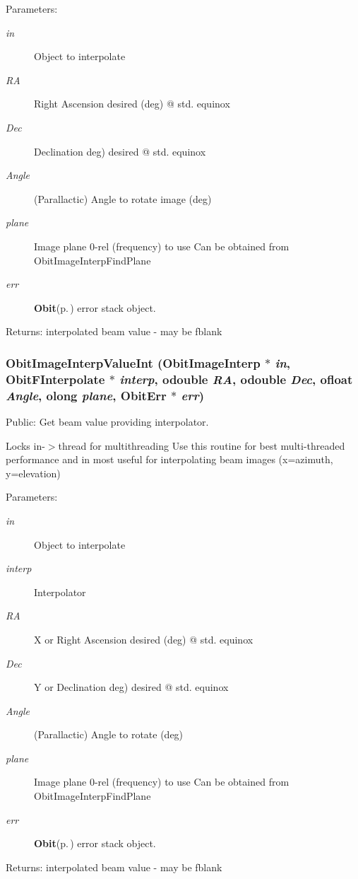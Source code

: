 \begin{Desc}
\item[Parameters:]
\begin{description}
\item[{\em in}]Object to interpolate \item[{\em RA}]Right Ascension desired (deg) @ std. equinox \item[{\em Dec}]Declination deg) desired @ std. equinox \item[{\em Angle}](Parallactic) Angle to rotate image (deg) \item[{\em plane}]Image plane 0-rel (frequency) to use Can be obtained from Obit\-Image\-Interp\-Find\-Plane \item[{\em err}]{\bf Obit}{\rm (p.\,\pageref{structObit})} error stack object. \end{description}
\end{Desc}
\begin{Desc}
\item[Returns:]interpolated beam value - may be fblank \end{Desc}
\subsubsection{ Obit\-Image\-Interp\-Value\-Int ({\bf Obit\-Image\-Interp} $\ast$ {\em in}, {\bf Obit\-FInterpolate} $\ast$ {\em interp}, {\bf odouble} {\em RA}, {\bf odouble} {\em Dec}, {\bf ofloat} {\em Angle}, {\bf olong} {\em plane}, {\bf Obit\-Err} $\ast$ {\em err})}\label{ObitImageInterp_8h_a15}


Public: Get beam value providing interpolator. 

Locks in-$>$thread for multithreading Use this routine for best multi-threaded performance and in most useful for interpolating beam images (x=azimuth, y=elevation) \begin{Desc}
\item[Parameters:]
\begin{description}
\item[{\em in}]Object to interpolate \item[{\em interp}]Interpolator \item[{\em RA}]X or Right Ascension desired (deg) @ std. equinox \item[{\em Dec}]Y or Declination deg) desired @ std. equinox \item[{\em Angle}](Parallactic) Angle to rotate (deg) \item[{\em plane}]Image plane 0-rel (frequency) to use Can be obtained from Obit\-Image\-Interp\-Find\-Plane \item[{\em err}]{\bf Obit}{\rm (p.\,\pageref{structObit})} error stack object. \end{description}
\end{Desc}
\begin{Desc}
\item[Returns:]interpolated beam value - may be fblank \end{Desc}
